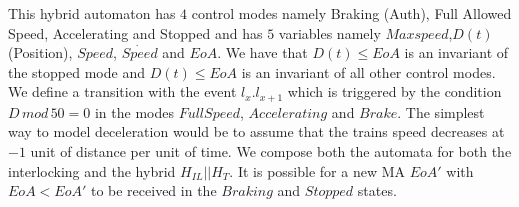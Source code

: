 This hybrid automaton has $4$ control modes namely Braking (Auth), Full Allowed Speed, Accelerating and Stopped and has $5$ variables namely $Maxspeed$,$D(t)$ (Position),  $Speed$, $\dot{Speed}$ and $EoA$. We have that $D(t) \leq EoA$ is an invariant of the stopped mode and $D(t) \leq EoA$ is an invariant of all other control modes.
We define a transition with the event $l_x.l_{x+1}$ which is triggered by the condition $D \,  mod \, 50 = 0$ in the modes $Full Speed$, $Accelerating$ and $Brake$. 
The simplest way to model deceleration would be to assume that the trains speed decreases at $-1$ unit of distance per unit of time.   We compose both the automata for both the interlocking and the hybrid $H_{IL} || H_{T}$. It is possible for a new MA $EoA'$ with $EoA < EoA'$ to be received in the $Braking$ and $Stopped$ states. 



\begin{figure} [h!]

\begin{center}
\end{center}

\label{fig:ILAuton}
\end{figure}


